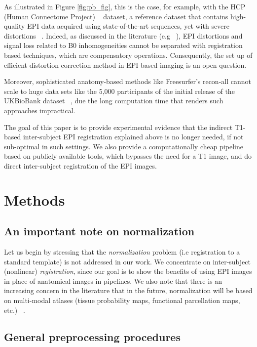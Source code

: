 As illustrated in Figure \ref{fig:pb_fig}, this is the case, for
example, with the HCP (Human Connectome Project)
~\citep{VanEssen20122222} dataset, a reference dataset that contains
high-quality EPI data acquired using state-of-the-art sequences, yet
with severe distortions
~\citep{pmid9178246,pmid12270226,zeng2002,anderson2003}.
%
Indeed, as discussed in the literature (e.g ~\citep{pmid12071618}), EPI
distortions and signal loss related to B0 inhomogeneities cannot be
separated with registration based techniques, which are compensatory
operations.  Consequently, the set up of efficient distortion
correction method in EPI-based imaging is an open question.

Moreover, sophisticated anatomy-based methods like Freesurfer's
recon-all cannot scale to huge data sets like the 5,000 participants
of the initial release of the UKBioBank dataset ~\citep{Miller2016}, due
the long computation time 
%
that renders such approaches impractical.

The goal of this paper is to provide experimental evidence that the
indirect T1-based inter-subject EPI registration explained above is no
longer needed, if not sub-optimal in such settings. We also provide a
computationally cheap pipeline based on publicly available tools,
which bypasses the need for a T1 image, and do direct inter-subject
registration of the EPI images.

\section{Methods}
\subsection{An important note on normalization}
Let us begin by stressing that the \textit{normalization} problem (i.e
registration to a standard template) is not addressed in our work. We
concentrate on inter-subject (nonlinear) \textit{registration}, since
our goal is to show the benefits of using EPI images in place of
anatomical images in pipelines. 
%
We also note that there is an increasing concern in the literature
that in the future, normalization will be based on multi-modal atlases
(tissue probability maps, functional parcellation maps, etc.)
~\citep{pmid24936682}.
\subsection{General preprocessing procedures}
\label{sec:gen_proc}
